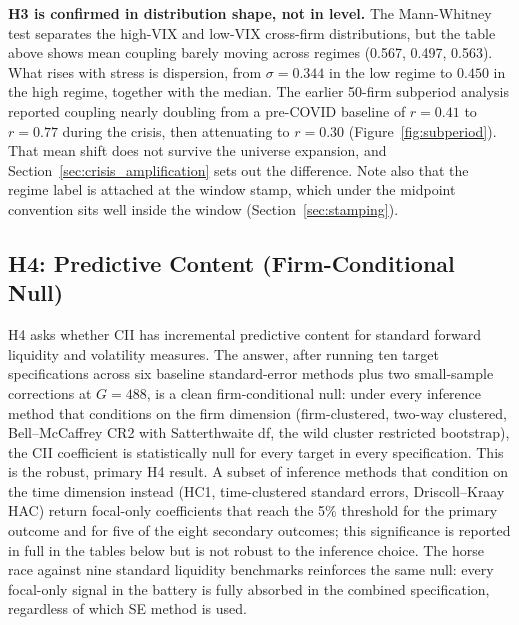 \documentclass[preprint,12pt,authoryear]{elsarticle}
\begin{document}
\noindent \textbf{H3 is confirmed in distribution shape, not in level.} The Mann-Whitney test separates the high-VIX and low-VIX cross-firm distributions, but the table above shows mean coupling barely moving across regimes (0.567, 0.497, 0.563). What rises with stress is dispersion, from $\sigma = 0.344$ in the low regime to $0.450$ in the high regime, together with the median. The earlier 50-firm subperiod analysis reported coupling nearly doubling from a pre-COVID baseline of $r = 0.41$ to $r = 0.77$ during the crisis, then attenuating to $r = 0.30$ (Figure~\ref{fig:subperiod}). That mean shift does not survive the universe expansion, and Section~\ref{sec:crisis_amplification} sets out the difference. Note also that the regime label is attached at the window stamp, which under the midpoint convention sits well inside the window (Section~\ref{sec:stamping}).

\subsection{H4: Predictive Content (Firm-Conditional Null)}
\label{sec:h4}

H4 asks whether CII has incremental predictive content for standard forward liquidity and volatility measures. The answer, after running ten target specifications across six baseline standard-error methods plus two small-sample corrections at $G = 488$, is a clean firm-conditional null: under every inference method that conditions on the firm dimension (firm-clustered, two-way clustered, Bell--McCaffrey CR2 with Satterthwaite df, the wild cluster restricted bootstrap), the CII coefficient is statistically null for every target in every specification. This is the robust, primary H4 result. A subset of inference methods that condition on the time dimension instead (HC1, time-clustered standard errors, Driscoll--Kraay HAC) return focal-only coefficients that reach the 5\% threshold for the primary outcome and for five of the eight secondary outcomes; this significance is reported in full in the tables below but is not robust to the inference choice. The horse race against nine standard liquidity benchmarks reinforces the same null: every focal-only signal in the battery is fully absorbed in the combined specification, regardless of which SE method is used.
\end{document}
